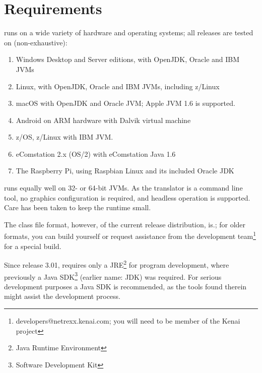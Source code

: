 \chapter{Requirements}
\nr{}  runs on a wide variety of
hardware and operating systems; all releases are tested on (non-exhaustive):
\begin{enumerate}
\item Windows Desktop and Server editions, with OpenJDK, Oracle and IBM JVMs
\item Linux, with OpenJDK, Oracle and IBM JVMs, including z/Linux
\item macOS with OpenJDK and Oracle JVM; Apple JVM 1.6 is supported.
\item Android on ARM hardware with Dalvik virtual machine
\item z/OS, z/Linux with IBM JVM.
\item eComstation 2.x (OS/2) with eComstation Java 1.6
\item The Raspberry Pi, using Raspbian Linux and its included Oracle JDK
\end{enumerate}
\nr{} runs equally well on 32- or 64-bit JVMs. As the translator is
a command line tool, no graphics configuration is required, and
headless operation is supported. Care has been taken to keep the \nr{} runtime small.

The class file format, however, of the current release distribution, is.; for older formats, you
can build \nr{} yourself or request assistance from the development
team\footnote{developers@netrexx.kenai.com; you will
  need to be member of the Kenai \nr{} project} for a special build.
\begin{shaded}\noindent
Since release 3.01, \nr{} requires only a
JRE\footnote{Java Runtime Environment} for program development, where previously a
Java SDK\footnote{Software Development Kit} (earlier name: JDK) was required. For serious development
purposes a Java SDK is recommended, as the tools found therein might
assist the development process.
\end{shaded}\indent

